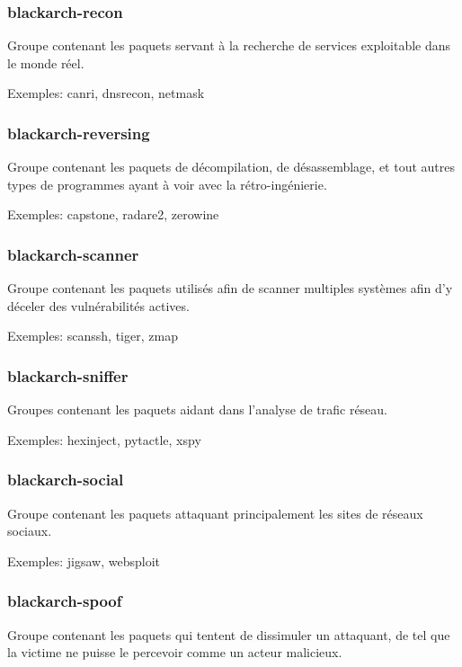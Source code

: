 \documentclass[a4paper, oneside, 11pt]{book}
\begin{document}
\subsubsection{blackarch-recon}

Groupe contenant les paquets servant à la recherche de services exploitable dans
le monde réel.

Exemples: canri, dnsrecon, netmask

\subsubsection{blackarch-reversing}

Groupe contenant les paquets de décompilation, de désassemblage, et tout autres
types de programmes ayant à voir avec la rétro-ingénierie.

Exemples: capstone, radare2, zerowine

\subsubsection{blackarch-scanner}

Groupe contenant les paquets utilisés afin de scanner multiples systèmes afin
d'y déceler des vulnérabilités actives.

Exemples: scanssh, tiger, zmap

\subsubsection{blackarch-sniffer}

Groupes contenant les paquets aidant dans l'analyse de trafic réseau.

Exemples: hexinject, pytactle, xspy

\subsubsection{blackarch-social}

Groupe contenant les paquets attaquant principalement les sites de réseaux
sociaux.

Exemples: jigsaw, websploit

\subsubsection{blackarch-spoof}

Groupe contenant les paquets qui tentent de dissimuler un attaquant, de tel que
la victime ne puisse le percevoir comme un acteur malicieux.
\end{document}
